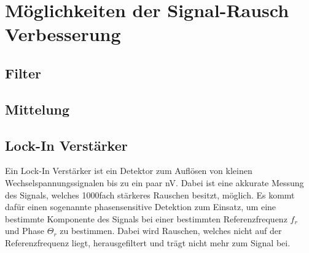 \newpage
\section{Möglichkeiten der Signal-Rausch Verbesserung}
\label{sec:verbesserung}
\subsection{Filter}
\label{sub:filter}
\subsection{Mittelung}
\label{sub:mittelung}
\newpage
\subsection{Lock-In Verstärker}
\label{sub:lockin}
Ein Lock-In Verstärker ist ein Detektor zum Auflösen von kleinen Wechselspannungssignalen bis zu ein paar nV. Dabei ist eine akkurate Messung des Signals, welches 1000fach stärkeres Rauschen besitzt, möglich. Es kommt dafür einen sogenannte phasensensitive Detektion zum Einsatz, um eine bestimmte Komponente des Signals bei einer bestimmten Referenzfrequenz $f_{r}$ und Phase $\Theta_{r}$ zu bestimmen. Dabei wird Rauschen, welches nicht auf der Referenzfrequenz liegt, herausgefiltert und trägt nicht mehr zum Signal bei.
